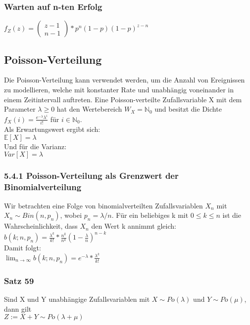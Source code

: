 \documentclass[11pt]{article}
\begin{document}
{\subsubsection{Warten auf n-ten Erfolg}
\label{sec:orgfebd376}
\(f_Z(z) = \begin{pmatrix} z - 1 \\ n - 1 \end{pmatrix} * p^n(1-p) (1-p)^{z-n}\)
\subsection{Poisson-Verteilung}
\label{sec:orgd58ea2c}
Die Poisson-Verteilung kann verwendet werden, um die Anzahl von Ereignissen zu
modellieren, welche mit konstanter Rate und unabhängig voneinander in einem
Zeitintervall auftreten.
Eine Poisson-verteilte Zufallsvariable X mit dem Parameter \(\lambda \geq 0\) hat den
Wertebereich \(W_X = \mathbb{N}_0\) und besitzt die Dichte
\(f_X(i) = \frac{e^{-\lambda}\lambda^i}{i!}\) für \(i \in \mathbb{N}_0\). \\
Als Erwartungswert ergibt sich: \\
\(\mathbb{E}[X] = \lambda\) \\
Und für die Varianz: \\
\(Var[X] = \lambda\)
\subsubsection{5.4.1 Poisson-Verteilung als Grenzwert der Binomialverteilung}
\label{sec:org1b1eece}
Wir betrachten eine Folge von binomialverteilten Zufallsvariablen \(X_n\) mit
\(X_n \sim Bin(n, p_n)\), wobei \(p_n = \lambda/n\). Für ein beliebiges k mit \(0 \leq k \leq n\) ist die Wahrscheinlichkeit, dass \(X_n\) den Wert k annimmt gleich: \\
\(b(k;n,p_n) = \frac{\lambda^k}{k!} * \frac{n^{\underline{k}}}{n^k} (1-\frac{\lambda}{n})^{n-k}\) \\
Damit folgt: \\
\(\lim_{n \rightarrow \infty} b(k;n,p_n) = e^{-\lambda} * \frac{\lambda^k}{k!}\)

\subsubsection{Satz 59}
\label{sec:orgabb5d78}
Sind X und Y unabhängige Zufallsvariablen mit \(X \sim Po(\lambda)\) und \(Y \sim Po(\mu)\), dann gilt \\
\(Z := X + Y  \sim Po(\lambda + \mu)\)

}
\end{document}
